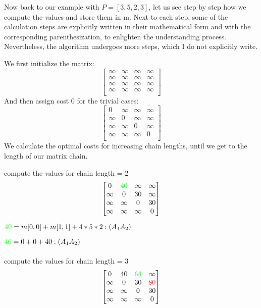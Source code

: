 Now back to our example with $P = [3, 5, 2, 3]$, let us see step by step how we compute the values and store them in m. Next to each step, 
some  of the calculation steps are explicitly written in their mathematical form and with the corresponding parenthesization, to enlighten the understanding process. Nevertheless, the algorithm
undergoes more steps, which I do not explicitly write.

We first initialize the matrix:
  \[
    \begin{bmatrix}
      \infty & \infty & \infty & \infty \\
      \infty & \infty & \infty & \infty \\
      \infty & \infty & \infty & \infty \\
      \infty & \infty & \infty & \infty \\
    \end{bmatrix}
  \]
And then assign cost 0 for the trivial cases: 
  \[
    \begin{bmatrix}
      0 & \infty & \infty & \infty \\
      \infty & 0 & \infty & \infty \\
      \infty & \infty & 0 & \infty \\
      \infty & \infty & \infty & 0 \\
    \end{bmatrix}
  \]
We calculate the optimal costs for increasing chain lengths, until we get to the length of our matrix chain.

compute the values for chain length = 2
  \[
    \begin{bmatrix}
      0 &  \textcolor{green}{40} & \infty & \infty \\
      \infty & 0 &  30  & \infty \\
      \infty & \infty & 0 & 30 \\
      \infty & \infty & \infty & 0 \\
    \end{bmatrix}
  \]

$\textcolor{green}{40} = m[0,0] + m[1,1] + 4*5*2 : (A_{1}A_{2})$

$\textcolor{green}{40} = 0 + 0  + 40 : (A_{1}A_{2})$
\\
\\
compute the values for chain length = 3
  \[
    \begin{bmatrix}
      0 & 40 & \textcolor{green}{64} & \infty \\
      \infty & 0 & 30  & \textcolor{red}{80} \\
      \infty & \infty & 0 & 30 \\
      \infty & \infty & \infty & 0 \\
    \end{bmatrix}
  \]
  
